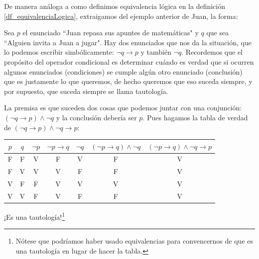 \documentclass{book}
\theoremstyle{definition}
\begin{document}
De manera análoga a como definimos equivalencia lógica en la definición \ref{df_equivalenciaLogica}, extraigamos del ejemplo anterior de Juan, la forma:

Sea $p$ el enunciado ``Juan repasa sus apuntes de matemáticas" y $q$ que sea ``Alguien invita a Juan a jugar".
Hay dos enunciados que nos da la situación, que lo podemos escribir simbólicamente: $\neg q\rightarrow p$ y también $\neg q$.
Recordemos que el propósito del operador condicional es determinar cuándo es verdad que si ocurren algunos enunciados (condiciones) se cumple algún otro enunciado (conclusión) que es justamente lo que queremos, de hecho queremos que eso suceda siempre, y por supuesto, que suceda siempre se llama tautología.

La premisa es que suceden dos cosas que podemos juntar con una conjunción: $(\neg q \rightarrow p) \wedge \neg q$ y la conclusión debería ser $p$. Pues hagamos la tabla de verdad de $(\neg q \rightarrow p) \wedge \neg q \rightarrow p$:
\begin{center}\begin{tabular}{|c|c||c|c|c|c|c|}
	\hline
	$p$ & $q$ & $\neg p$ & $\neg p \rightarrow q$ & $\neg q$ & $(\neg p \rightarrow q)\wedge \neg q$ & $(\neg p \rightarrow q)\wedge \neg q \rightarrow p$ \\
	\hline \hline
	F&F&V&F&V&F&V\\ \hline
	F&V&V&V&F&F&V\\ \hline
	V&F&F&V&V&V&V\\ \hline
	V&V&F&V&F&F&V\\ \hline
\end{tabular}\end{center}
¡Es una tautología!\footnote{Nótese que podríamos haber usado equivalencias para convencernos de que es una tautología en lugar de hacer la tabla.}
\end{document}

